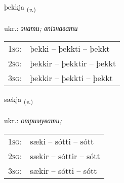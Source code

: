 \documentclass[frontgrid, backgrid]{flacards}\usepackage[]{graphicx}\usepackage[]{xcolor}
\begin{document}
\renewcommand{\flhead}{\vskip5pt \fboxsep=0pt {\small\bfseries\footnotesize Sagnorð | дієслово}}
\renewcommand{\fcfoot}{\vskip5pt \fboxsep=0pt \hspace{2pt}{\small\bfseries\footnotesize 1K}}

\renewcommand{\blhead}{\vskip5pt {\small\bfseries\footnotesize Sagnorð | дієслово }}
\renewcommand{\bcfoot}{\vskip5pt \hspace{2pt}{\small\bfseries\footnotesize 1K}}


{þekkja \small{\textsubscript{(\textit{v.})}} \\[1ex] %
\textphonetic{[θɛhca]} \\
ukr.: \emph{знати; впізнавати} \\  [2ex]
\renewcommand*{\arraystretch}{0.8}
\begin{tabular}{p{1cm}l}
\textsc{1sg}: & þekki -- þekkti -- þekkt \\ 
\textsc{2sg}: & þekkir -- þekktir -- þekkt \\ 
\textsc{3sg}: & þekkir -- þekkti -- þekkt \\ 
\end{tabular}
}

\renewcommand{\flhead}{\vskip5pt \fboxsep=0pt {\small\bfseries\footnotesize Sagnorð | дієслово}}
\renewcommand{\fcfoot}{\vskip5pt \fboxsep=0pt \hspace{2pt}{\small\bfseries\footnotesize 1K}}

\renewcommand{\blhead}{\vskip5pt {\small\bfseries\footnotesize Sagnorð | дієслово }}
\renewcommand{\bcfoot}{\vskip5pt \hspace{2pt}{\small\bfseries\footnotesize 1K}}


{sækja \small{\textsubscript{(\textit{v.})}} \\[1ex] %
\textphonetic{[saiːca]} \\
ukr.: \emph{отримувати;} \\  [2ex]
\renewcommand*{\arraystretch}{0.8}
\begin{tabular}{p{1cm}l}
\textsc{1sg}: & sæki -- sótti -- sótt \\ 
\textsc{2sg}: & sækir -- sóttir -- sótt \\ 
\textsc{3sg}: & sækir -- sótti -- sótt \\ 
\end{tabular}
}
\end{document}
